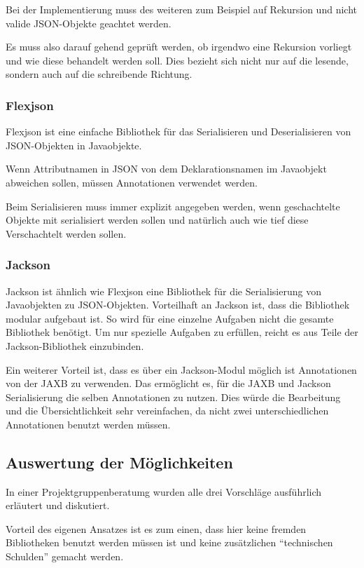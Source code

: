 Bei der Implementierung muss des weiteren zum Beispiel auf Rekursion und nicht valide \ac{JSON}-Objekte geachtet werden.

Es muss also darauf gehend gepr\"uft werden, ob irgendwo eine Rekursion vorliegt und wie diese behandelt werden soll. Dies bezieht sich nicht nur auf die lesende, sondern auch auf die schreibende Richtung.

\subsubsection{Flexjson}
Flexjson ist eine einfache Bibliothek f\"ur das Serialisieren und Deserialisieren von \ac{JSON}-Objekten in Javaobjekte.

Wenn Attributnamen in \ac{JSON} von dem Deklarationsnamen im Javaobjekt abweichen sollen, m\"ussen Annotationen verwendet werden.

Beim Serialisieren muss immer explizit angegeben werden, wenn geschachtelte Objekte mit serialisiert werden sollen und nat\"urlich auch wie tief diese Verschachtelt werden sollen.

\subsubsection{Jackson}
Jackson ist \"ahnlich wie Flexjson eine Bibliothek f\"ur die Serialisierung von Javaobjekten zu \ac{JSON}-Objekten. Vorteilhaft an Jackson ist, dass die Bibliothek modular aufgebaut ist. So wird f\"ur eine einzelne Aufgaben nicht die gesamte Bibliothek ben\"otigt. Um nur spezielle Aufgaben zu erf\"ullen, reicht es aus Teile der Jackson-Bibliothek einzubinden.

Ein weiterer Vorteil ist, dass es \"uber ein Jackson-Modul m\"oglich ist Annotationen von der \ac{JAXB} zu verwenden. Das
erm\"oglicht es, f\"ur die \ac{JAXB} und Jackson Serialisierung die selben Annotationen zu nutzen. Dies w\"urde die Bearbeitung und die \"Ubersichtlichkeit sehr vereinfachen, da nicht zwei unterschiedlichen Annotationen benutzt werden m\"ussen.

\subsection{Auswertung der M\"oglichkeiten}
In einer Projektgruppenberatumg wurden alle drei Vorschl\"age ausf\"uhrlich erl\"autert und diskutiert. 

Vorteil des eigenen Ansatzes ist es zum einen, dass hier keine fremden Bibliotheken benutzt werden m\"ussen ist und keine zus\"atzlichen "`technischen Schulden"' gemacht werden. 

